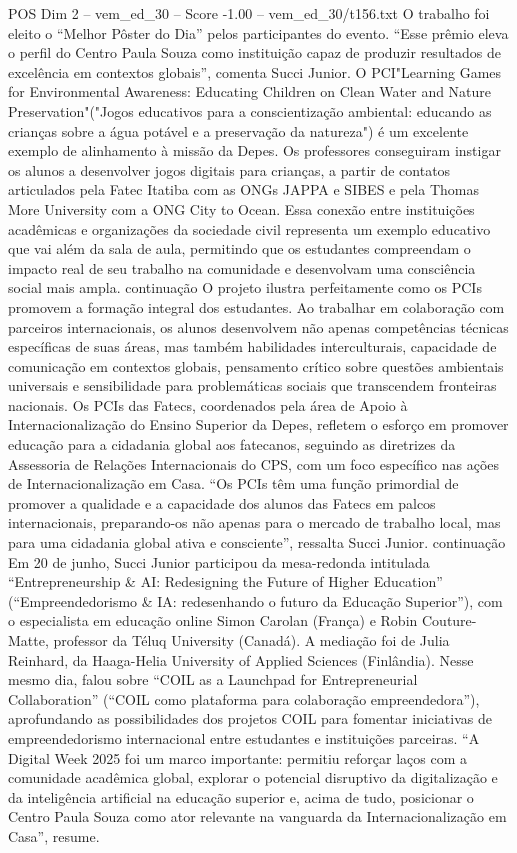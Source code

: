 \begin{textsample}{POS Dim 2 – vem\_ed\_30 – Score -1.00 – vem\_ed\_30/t156.txt}
O trabalho foi eleito o “Melhor Pôster do Dia” pelos participantes do evento. “Esse prêmio eleva o perfil do Centro Paula Souza como instituição capaz de produzir resultados de excelência em contextos globais”, comenta Succi Junior.
O PCI"Learning Games for Environmental Awareness: Educating Children on Clean Water and Nature Preservation"("Jogos educativos para a conscientização ambiental: educando as crianças sobre a água potável e a preservação da natureza") é um excelente exemplo de alinhamento à missão da Depes.
Os professores conseguiram instigar os alunos a desenvolver jogos digitais para crianças, a partir de contatos articulados pela Fatec Itatiba com as ONGs JAPPA e SIBES e pela Thomas More University com a ONG City to Ocean.
Essa conexão entre instituições acadêmicas e organizações da sociedade civil representa um exemplo educativo que vai além da sala de aula, permitindo que os estudantes compreendam o impacto real de seu trabalho na comunidade e desenvolvam uma consciência social mais ampla. continuação O projeto ilustra perfeitamente como os PCIs promovem a formação integral dos estudantes.
Ao trabalhar em colaboração com parceiros internacionais, os alunos desenvolvem não apenas competências técnicas específicas de suas áreas, mas também habilidades interculturais, capacidade de comunicação em contextos globais, pensamento crítico sobre questões ambientais universais e sensibilidade para problemáticas sociais que transcendem fronteiras nacionais.
Os PCIs das Fatecs, coordenados pela área de Apoio à Internacionalização do Ensino Superior da Depes, refletem o esforço em promover educação para a cidadania global aos fatecanos, seguindo as diretrizes da Assessoria de Relações Internacionais do CPS, com um foco específico nas ações de Internacionalização em Casa. “Os PCIs têm uma função primordial de promover a qualidade e a capacidade dos alunos das Fatecs em palcos internacionais, preparando-os não apenas para o mercado de trabalho local, mas para uma cidadania global ativa e consciente”, ressalta Succi Junior. continuação Em 20 de junho, Succi Junior participou da mesa-redonda intitulada “Entrepreneurship \& AI: Redesigning the Future of Higher Education” (“Empreendedorismo \& IA: redesenhando o futuro da Educação Superior”), com o especialista em educação online Simon Carolan (França) e Robin Couture-Matte, professor da Téluq University (Canadá).
A mediação foi de Julia Reinhard, da Haaga-Helia University of Applied Sciences (Finlândia).
Nesse mesmo dia, falou sobre “COIL as a Launchpad for Entrepreneurial Collaboration” (“COIL como plataforma para colaboração empreendedora”), aprofundando as possibilidades dos projetos COIL para fomentar iniciativas de empreendedorismo internacional entre estudantes e instituições parceiras. “A Digital Week 2025 foi um marco importante: permitiu reforçar laços com a comunidade acadêmica global, explorar o potencial disruptivo da digitalização e da inteligência artificial na educação superior e, acima de tudo, posicionar o Centro Paula Souza como ator relevante na vanguarda da Internacionalização em Casa”, resume.

\end{textsample}

